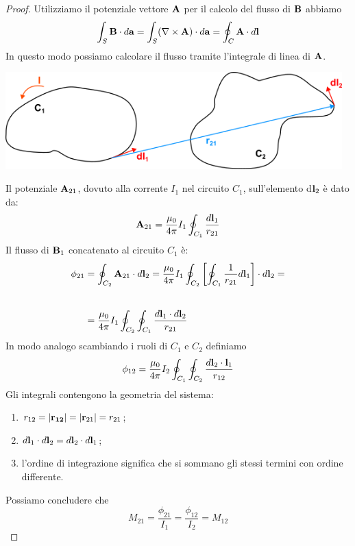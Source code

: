 \begin{proof}
Utilizziamo il potenziale vettore $\bold{A}$ per il calcolo del flusso di $\bold{B}$ abbiamo
\begin{equation*}
	\int_{S}\bold{B} \cdot d\bold{a} = \int_{S}(\nabla \times \bold{A}) \cdot d\bold{a} = \oint_{C} \bold{A} \cdot d\bold{l}
\end{equation*}	
In questo modo possiamo calcolare il flusso tramite l'integrale di linea di $\bold{A}$.
\begin{center}
	\includegraphics[width = 13cm]{images/inductance_path}
\end{center}
Il potenziale $\bold{A}_{21}$, dovuto alla corrente $I_1$ nel circuito $C_1$, sull'elemento d$\bold{l}_2$ \`e dato da:
\begin{equation*}
	\bold{A}_{21}= \frac{\mu_0 }{4 \pi}	I_1 \oint_{C_1}\frac{d \bold{l}_1}{r_{21}}
\end{equation*} 
Il flusso di $\bold{B}_1$ concatenato al circuito $C_1$ \`e:
\begin{align*}
	\phi_{21} & = \oint_{C_2} \bold{A}_{21} \cdot d\bold{l}_2 = \frac{\mu_0}{4 \pi}I_1 \oint_{C_2}\left[\oint_{C_1} \frac{1}{r_{21}}d\bold{l}_1 \right] \cdot d\bold{l}_2 = \\ \rule{0pt}{35pt}
	& = \frac{\mu_0}{4 \pi}I_1 \oint_{C_2} \oint_{C_1} \frac{d \bold{l}_1 \cdot d\bold{l}_2}{r_{21}}
\end{align*}
In modo analogo scambiando i ruoli di $C_1$ e $C_2$ definiamo
\begin{equation*}
	\phi_{12} = \frac{\mu_0}{4 \pi}I_2 \oint_{C_1}\oint_{C_2} \frac{d \bold{l}_2 \cdot \bold{l}_1}{r_{12}}
\end{equation*}
Gli integrali contengono la geometria del sistema:
\begin{enumerate}
	\item $r_{12} = |\bold{r_{12}}| = |\bold{r}_{21}| = r_{21}$;
	\item $d \bold{l}_1 \cdot d \bold{l}_2 = d \bold{l}_2 \cdot d\bold{l}_1$;
	\item l'ordine di integrazione significa che si sommano gli stessi termini con ordine differente.
\end{enumerate}
Possiamo concludere che 
\begin{equation*}
	M_{21} = \frac{\phi_{21}}{I_1} = \frac{\phi_{12}}{I_2} = M_{12}
\end{equation*}

\end{proof}

